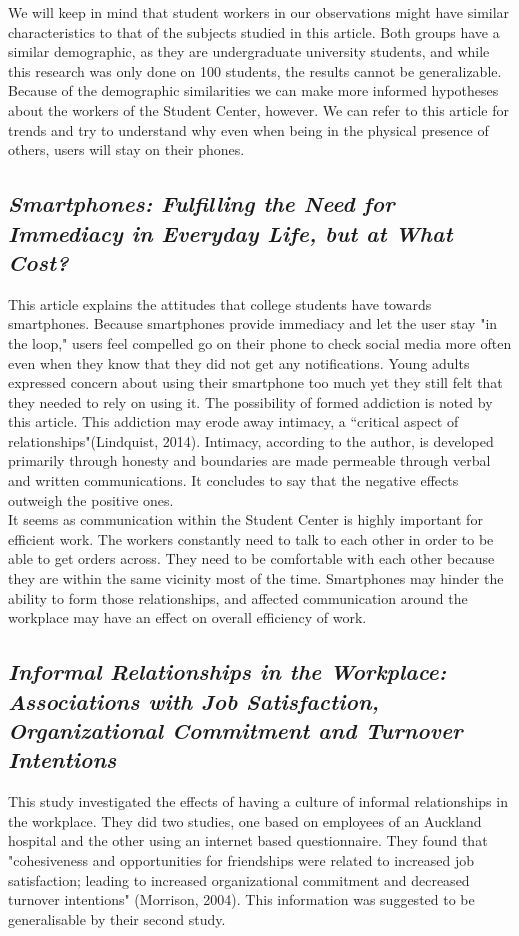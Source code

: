 \documentclass[letterpaper, 12pt]{report}
\begin{document}
	We will keep in mind that student workers in our observations might have similar characteristics to that of the subjects studied in this article. Both groups have a similar demographic, as they are undergraduate university students, and while this research was only done on 100 students, the results cannot be generalizable. Because of the demographic similarities we can make more informed hypotheses about the workers of the Student Center, however. We can refer to this article for trends and try to understand why even when being in the physical presence of others, users will stay on their phones.
	
	\subsection{\textit{Smartphones: Fulfilling the Need for Immediacy in Everyday Life, but at What Cost?}}
	This article explains the attitudes that college students have towards smartphones. Because smartphones provide immediacy and let the user stay "in the loop," users feel compelled go on their phone to check social media more often even when they know that they did not get any notifications. Young adults expressed concern about using their smartphone too much yet they still felt that they needed to rely on using it. The possibility of formed addiction is noted by this article. This addiction may erode away intimacy, a ``critical aspect of relationships"(Lindquist, 2014). Intimacy, according to the author, is developed primarily through honesty and boundaries are made permeable through verbal and written communications. It concludes to say that the negative effects outweigh the positive ones.\\
	
	It seems as communication within the Student Center is highly important for efficient work. The workers constantly need to talk to each other in order to be able to get orders across. They need to be comfortable with each other because they are within the same vicinity most of the time. Smartphones may hinder the ability to form those relationships, and affected communication around the workplace may have an effect on overall efficiency of work.
	
	\subsection{\textit{Informal Relationships in the Workplace: Associations with Job Satisfaction, Organizational Commitment and Turnover Intentions}}
	This study investigated the effects of having a culture of informal relationships in the workplace. They did two studies, one based on employees of an Auckland hospital and the other using an internet based questionnaire. They found that "cohesiveness and opportunities for friendships were related to increased job satisfaction; leading to increased organizational commitment and decreased turnover intentions" (Morrison, 2004). This information was suggested to be generalisable by their second study.\\
	
\end{document}

